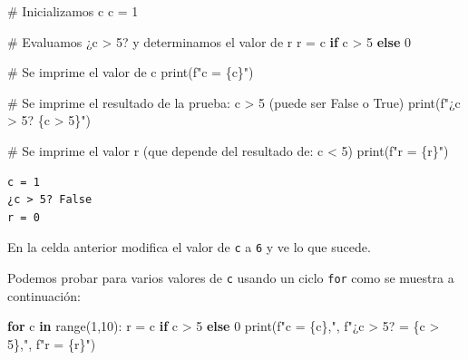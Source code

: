 \documentclass[
  spanish,
  letterpaper,
]{scrbook}
\newenvironment{Shaded}{\begin{snugshade}}{\end{snugshade}}
\newcommand{\BuiltInTok}[1]{\textcolor[rgb]{0.00,0.23,0.31}{#1}}
\newcommand{\CommentTok}[1]{\textcolor[rgb]{0.37,0.37,0.37}{#1}}
\newcommand{\ControlFlowTok}[1]{\textcolor[rgb]{0.00,0.23,0.31}{\textbf{#1}}}
\newcommand{\DecValTok}[1]{\textcolor[rgb]{0.68,0.00,0.00}{#1}}
\newcommand{\KeywordTok}[1]{\textcolor[rgb]{0.00,0.23,0.31}{\textbf{#1}}}
\newcommand{\NormalTok}[1]{\textcolor[rgb]{0.00,0.23,0.31}{#1}}
\newcommand{\OperatorTok}[1]{\textcolor[rgb]{0.37,0.37,0.37}{#1}}
\newcommand{\SpecialCharTok}[1]{\textcolor[rgb]{0.37,0.37,0.37}{#1}}
\newcommand{\SpecialStringTok}[1]{\textcolor[rgb]{0.13,0.47,0.30}{#1}}
\theoremstyle{definition}
\theoremstyle{remark}
\begin{document}
\begin{Shaded}
\begin{Highlighting}[]
\CommentTok{\# Inicializamos c}
\NormalTok{c }\OperatorTok{=} \DecValTok{1}

\CommentTok{\# Evaluamos ¿c \textgreater{} 5? y determinamos el valor de r}
\NormalTok{r }\OperatorTok{=}\NormalTok{ c }\ControlFlowTok{if}\NormalTok{ c }\OperatorTok{\textgreater{}} \DecValTok{5} \ControlFlowTok{else} \DecValTok{0}

\CommentTok{\# Se imprime el valor de c}
\BuiltInTok{print}\NormalTok{(}\SpecialStringTok{f"c = }\SpecialCharTok{\{}\NormalTok{c}\SpecialCharTok{\}}\SpecialStringTok{"}\NormalTok{) }

\CommentTok{\# Se imprime el resultado de la prueba: c \textgreater{} 5 (puede ser False o True)}
\BuiltInTok{print}\NormalTok{(}\SpecialStringTok{f"¿c \textgreater{} 5? }\SpecialCharTok{\{}\NormalTok{c }\OperatorTok{\textgreater{}} \DecValTok{5}\SpecialCharTok{\}}\SpecialStringTok{"}\NormalTok{)  }

\CommentTok{\# Se imprime el valor r (que depende del resultado de: c \textless{} 5)}
\BuiltInTok{print}\NormalTok{(}\SpecialStringTok{f"r = }\SpecialCharTok{\{}\NormalTok{r}\SpecialCharTok{\}}\SpecialStringTok{"}\NormalTok{) }
\end{Highlighting}
\end{Shaded}

\begin{verbatim}
c = 1
¿c > 5? False
r = 0
\end{verbatim}

En la celda anterior modifica el valor de \texttt{c} a \texttt{6} y ve
lo que sucede.

Podemos probar para varios valores de \texttt{c} usando un ciclo
\texttt{for} como se muestra a continuación:

\begin{Shaded}
\begin{Highlighting}[]
\ControlFlowTok{for}\NormalTok{ c }\KeywordTok{in} \BuiltInTok{range}\NormalTok{(}\DecValTok{1}\NormalTok{,}\DecValTok{10}\NormalTok{):}
\NormalTok{    r }\OperatorTok{=}\NormalTok{ c }\ControlFlowTok{if}\NormalTok{ c }\OperatorTok{\textgreater{}} \DecValTok{5} \ControlFlowTok{else} \DecValTok{0}
    \BuiltInTok{print}\NormalTok{(}\SpecialStringTok{f"c = }\SpecialCharTok{\{}\NormalTok{c}\SpecialCharTok{\}}\SpecialStringTok{,"}\NormalTok{, }\SpecialStringTok{f"¿c \textgreater{} 5? = }\SpecialCharTok{\{}\NormalTok{c }\OperatorTok{\textgreater{}} \DecValTok{5}\SpecialCharTok{\}}\SpecialStringTok{,"}\NormalTok{, }\SpecialStringTok{f"r = }\SpecialCharTok{\{}\NormalTok{r}\SpecialCharTok{\}}\SpecialStringTok{"}\NormalTok{)}
\end{Highlighting}
\end{Shaded}
\end{document}
